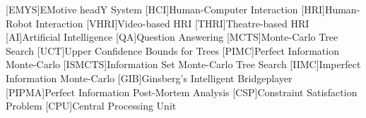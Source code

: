 \renewcommand{\listofacronymsname}{Glossary}
\listofacronyms

\begin{acronym}[PIPMA]
[EMYS]{EMotive headY System}
[HCI]{Human-Computer Interaction}
[HRI]{Human-Robot Interaction}
[VHRI]{Video-based HRI}
[THRI]{Theatre-based HRI}
[AI]{Artificial Intelligence}
[QA]{Question Answering}
[MCTS]{Monte-Carlo Tree Search}
[UCT]{Upper Confidence Bounds for Trees}
[PIMC]{Perfect Information Monte-Carlo}
[ISMCTS]{Information Set Monte-Carlo Tree Search}
[IIMC]{Imperfect Information Monte-Carlo}
[GIB]{Ginsberg's Intelligent Bridgeplayer}
[PIPMA]{Perfect Information Post-Mortem Analysis}
[CSP]{Constraint Satisfaction Problem}
[CPU]{Central Processing Unit}
\end{acronym}

\cleardoublepage


